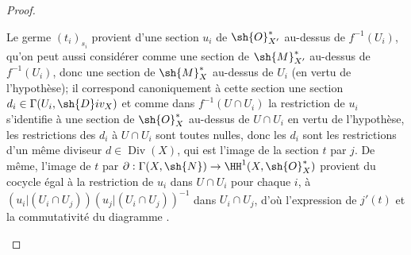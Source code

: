 \begin{proof}
\begin{enumerate}[label=(\roman*)]
Le germe $(t_i)_{s_i}$ provient d'une section $u_i$ de $\sh{O}^*_{X'}$ au-dessus de $f^{-1}(U_i)$, qu'on peut aussi considérer comme une section de $\sh{M}^*_{X'}$ au-dessus de $f^{-1}(U_i)$, donc une section de $\sh{M}^*_X$ au-dessus de $U_i$ (en vertu de l'hypothèse);
il correspond canoniquement à cette section une section $d_i\in\Gamma(U_i,\sh{D}iv_X)$ et comme dans $f^{-1}(U\cap U_i)$ la restriction de $u_i$ s'identifie à une section de $\sh{O}^*_X$ au-dessus de $U\cap U_i$ en vertu de l'hypothèse, les restrictions des $d_i$ à $U\cap U_i$ sont toutes nulles, donc les $d_i$ sont les restrictions d'un même diviseur $d\in\operatorname{Div}(X)$, qui est l'image de la section $t$ par $j$.
De même, l'image de $t$ par $\partial:\Gamma(X,\sh{N})\to\HH^1(X,\sh{O}^*_X)$ provient du cocycle égal à la restriction de $u_i$ dans $U\cap U_i$ pour chaque $i$, à $(u_i|(U_i\cap U_j))(u_j|(U_i\cap U_j))^{-1}$ dans $U_i\cap U_j$, d'où l'expression de $j'(t)$ et la commutativité du diagramme .
\end{enumerate}
\end{proof}

